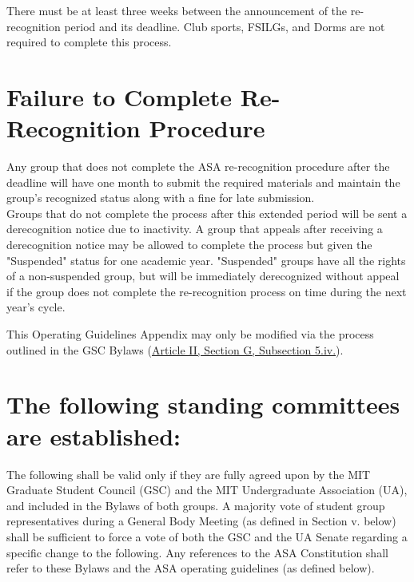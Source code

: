 \documentclass[12pt]{article}
\begin{document}
There must be at least three weeks between the announcement of the re-recognition period and its
deadline. Club sports, FSILGs, and Dorms are not required to complete this process.

\section{Failure to Complete Re-Recognition Procedure}
Any group that does not complete the ASA re-recognition procedure after the deadline will have one
month to submit the required materials and maintain the group’s recognized status along with a fine for
late submission.
\\

Groups that do not complete the process after this extended period will be sent a derecognition notice
due to inactivity. A group that appeals after receiving a derecognition notice may be allowed to complete
the process but given the "Suspended" status for one academic year. "Suspended" groups have all the
rights of a non-suspended group, but will be immediately derecognized without appeal if the group does
not complete the re-recognition process on time during the next year’s cycle.

This Operating Guidelines Appendix may only be modified via the process outlined in the GSC Bylaws %
(\hyperref[bylaws:5iv]{Article II, Section G, Subsection 5.iv.}).

\newpage

\label{app:C}

\setcounter{articlecount}{1}

\setcounter{sectioncount}{6}
\let\secnum\Alph
\let\subnum\Roman

\section{The following standing committees are established:}

The following shall be valid only if they are fully agreed upon by the MIT Graduate Student Council (GSC) and the MIT Undergraduate Association (UA), and included in the Bylaws of both groups. A majority vote of student group representatives during a General Body Meeting (as defined in Section v. below) shall be sufficient to force a vote of both the GSC and the UA Senate regarding a specific change to the following. Any references to the ASA Constitution shall refer to these Bylaws and the ASA operating guidelines (as defined below).
\end{document}
